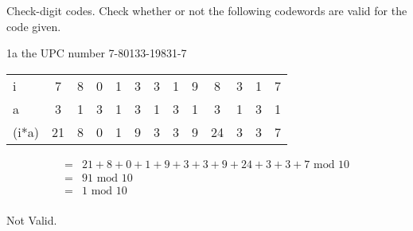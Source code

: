 \begin{question}{1}
Check-digit codes. Check whether or not the following codewords are valid for the
code given.
\end{question}


\begin{question}{1a}
the UPC number 7-80133-19831-7

\begin{tabular}{l|cccccccccccc}
\hline
i     & 7  & 8 & 0 & 1 & 3 & 3 & 1 & 9 & 8 & 3 & 1 & 7 \\
a     & 3  & 1 & 3 & 1 & 3 & 1 & 3 & 1 & 3 & 1 & 3 & 1\\
\hline
(i*a) & 21 & 8 & 0 & 1 & 9 & 3 & 3 & 9 & 24 & 3 & 3 & 7
\end{tabular}

\begin{align*}
=&21 + 8 + 0 + 1 + 9 + 3 + 3 + 9 + 24 + 3 + 3 + 7\textrm{ mod } 10\\
=&91 \textrm{ mod } 10\\
=&1 \textrm{ mod } 10\\
\end{align*}

Not Valid.
\end{question}


